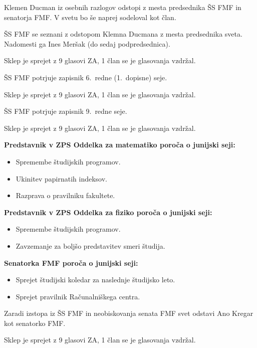 \documentclass{seja}
\begin{document}
\begin{ad}
	\item 
	Klemen Ducman iz osebnih razlogov odstopi z mesta predsednika ŠS FMF in senatorja FMF. V svetu bo še naprej sodeloval kot član.
	\begin{sklep}
		ŠS FMF se seznani z odstopom Klemna Ducmana z mesta predsednika sveta. Nadomesti ga Ines Meršak (do sedaj podpredsednica).
	\end{sklep}
	Sklep je sprejet z 9 glasovi ZA, 1 član se je glasovanja vzdržal. 

	\item 
	\begin{sklep}
		ŠS FMF potrjuje zapisnik 6.~redne (1.~dopisne) seje.
	\end{sklep}
	Sklep je sprejet z 9 glasovi ZA, 1 član se je glasovanja vzdržal.
	
	\begin{sklep}
		ŠS FMF potrjuje zapisnik 9.~redne seje.  
	\end{sklep}
	Sklep je sprejet z 9 glasovi ZA, 1 član se je glasovanja vzdržal. 

    \item
    \textbf{Predstavnik v ZPS Oddelka za matematiko poroča o junijski seji:}
    \begin{itemize}
        \item Spremembe študijskih programov. 
        \item Ukinitev papirnatih indeksov.
        \item Razprava o pravilniku fakultete.
    \end{itemize}
    
    \textbf{Predstavnik v ZPS Oddelka za fiziko poroča o junijski seji:}
    \begin{itemize}
        \item Spremembe študijskih programov.
        \item Zavzemanje za boljšo predstavitev smeri študija. 
    \end{itemize}
    
    \textbf{Senatorka FMF poroča o junijski seji:}
    \begin{itemize}
        \item Sprejet študijski koledar za naslednje študijsko leto.
        \item Sprejet pravilnik Računalniškega centra. 
    \end{itemize}
    
	\item 
	\begin{sklep}
		 Zaradi izstopa iz ŠS FMF in neobiskovanja senata FMF svet odstavi Ano Kregar kot senatorko FMF.
	\end{sklep}
	Sklep je sprejet z 9 glasovi ZA, 1 član se je glasovanja vzdržal.
	

\end{ad}
\end{document}
